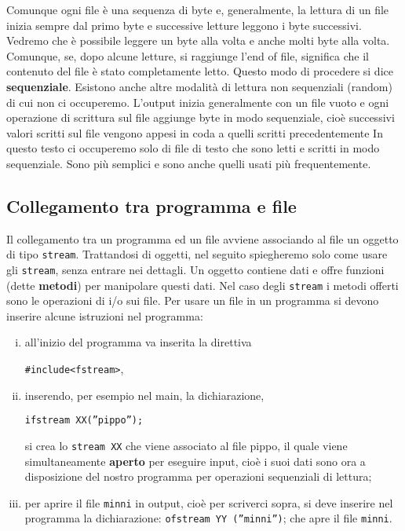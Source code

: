 Comunque ogni file è una sequenza di byte e, generalmente, la lettura di un file inizia sempre dal primo byte e successive letture leggono i byte successivi. Vedremo che è possibile leggere un byte alla volta e anche molti byte alla volta. Comunque, se, dopo alcune letture, si raggiunge l'end of file, significa che il contenuto del file è stato completamente letto.
Questo modo di procedere si dice \textbf{sequenziale}.
Esistono anche altre modalità di lettura non sequenziali (random) di cui non ci occuperemo.
L'output inizia generalmente con un file vuoto e ogni operazione di scrittura sul file aggiunge byte in modo sequenziale, cioè successivi valori scritti sul file vengono appesi in coda a quelli scritti precedentemente In questo testo ci occuperemo solo di file di testo che sono letti e scritti in modo sequenziale. Sono più semplici e sono anche quelli usati più frequentemente.

\subsection{Collegamento tra programma e file}
Il collegamento tra un programma ed un file avviene associando al file un oggetto di tipo \texttt{stream}.
Trattandosi di oggetti, nel seguito spiegheremo solo come usare gli \texttt{stream}, senza entrare nei dettagli.
Un oggetto contiene dati e offre funzioni (dette \textbf{metodi}) per manipolare questi dati.
Nel caso degli \texttt{stream} i metodi offerti sono le operazioni di i/o sui file.
Per usare un file in un programma si devono inserire alcune istruzioni nel programma: 

\begin{enumerate}[i)]
\item all'inizio del programma va inserita la direttiva

\texttt{\#include<fstream>},

\item inserendo, per esempio nel main, la dichiarazione,

\texttt{ifstream XX(''pippo'');}
			
\noindent si crea lo \texttt{stream XX} che viene associato al file pippo, il quale vie­ne simultaneamente \textbf{aperto} per eseguire input, cioè i suoi dati sono ora a disposizione del nostro programma per operazioni sequenziali di lettura;

\item per aprire il file \texttt{minni} in output, cioè per scriverci sopra, si deve inserire nel programma la dichiarazione: \texttt{ofstream YY (''minni'')}; che apre il file \texttt{minni}.
\end{enumerate}

